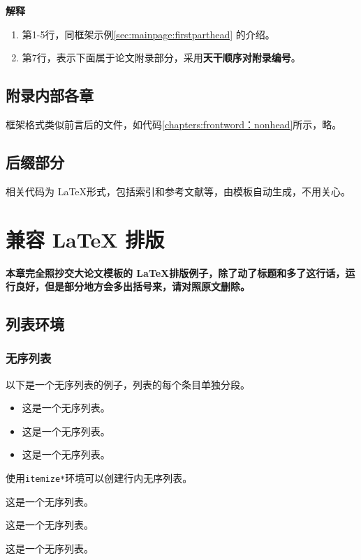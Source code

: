 \documentclass[doctor,openright,twoside]{sjtuthesis}
\providecommand{\tightlist}{%
    \setlength{\itemsep}{0pt}\setlength{\parskip}{0pt}}
\theoremstyle{plain}
\theoremstyle{definition}
\theoremstyle{remark}
\theoremstyle{ocrenumbox}
\theoremstyle{plain}
\begin{document}
\textbf{解释}

\begin{enumerate}
\def\labelenumi{\arabic{enumi}.}
\tightlist
\item
  第1-5行，同框架示例\ref{sec:mainpage:firstparthead} 的介绍。
\item
  第7行，表示下面属于论文附录部分，采用\textbf{天干顺序对附录编号}。
\end{enumerate}

\section{附录内部各章}

框架格式类似前言后的文件，如代码\ref{chapters:frontword：nonhead}所示，略。

\section{后缀部分}

相关代码为 \LaTeX 形式，包括索引和参考文献等，由模板自动生成，不用关心。

\chapter{兼容 {\LaTeX} 排版}
\label{chap:latex}

\textbf{本章完全照抄交大论文模板的
\LaTeX 排版例子，除了动了标题和多了这行话，运行良好，但是部分地方会多出括号来，请对照原文删除。}

\section{列表环境}
\label{sec:list}

\subsection{无序列表}
\label{sec:unorderlist}

以下是一个无序列表的例子，列表的每个条目单独分段。

\begin{itemize}
  \item 这是一个无序列表。
  \item 这是一个无序列表。
  \item 这是一个无序列表。
\end{itemize}

使用\verb+itemize*+环境可以创建行内无序列表。

\begin{itemize*}
  \item 这是一个无序列表。
  \item 这是一个无序列表。
  \item 这是一个无序列表。
\end{itemize*}
\end{document}
